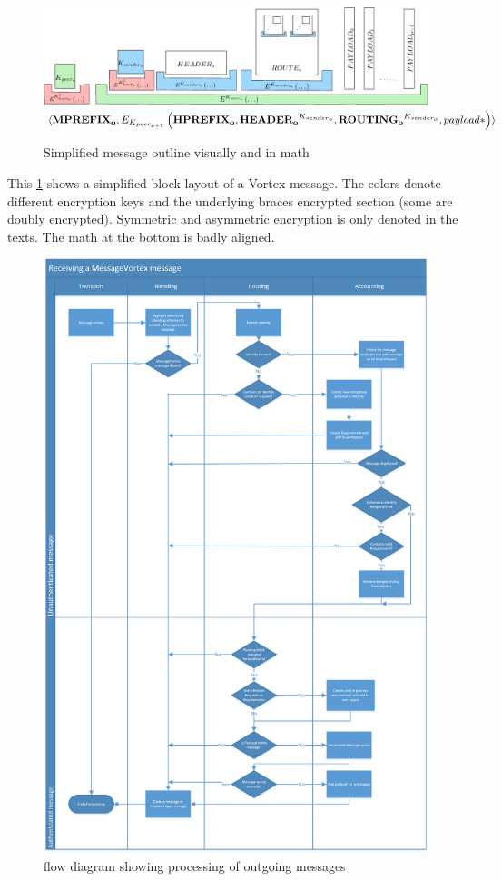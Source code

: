 \documentclass[11pt]{extarticle}
\newcommand{\splitatcommas}[1]{%
	\begingroup
	\ifnum\mathcode`,="8000
	\else
	\begingroup\lccode`~=`, \lowercase{\endgroup
		\edef~{\mathchar\the\mathcode`, \penalty0 \noexpand\hspace{0pt plus 1em}}%
	}\mathcode`,="8000
	\fi
	#1%
	\endgroup
}
\begin{document}
	\begin{figure}[!h]
	 	\includegraphics[width=\textwidth]{inc/blockLayoutSimplified}
	 	$\splitatcommas{\langle \mathbf{MPREFIX_o}, E_{K_{peer_{o+1}}}\left( \mathbf{HPREFIX_o}, \mathbf{HEADER_o}^{K_{sender_o}}, \mathbf{ROUTING_o}^{K_{sender_o}}, payload* \right) \rangle}$
	 	\caption{Simplified message outline visually and in math}
	 	\label{fig:messageOutline}
	\end{figure}
	This \cref{fig:messageOutline} shows a simplified block layout of a Vortex message. The colors denote different encryption keys and the underlying braces encrypted section (some are doubly encrypted). Symmetric and asymmetric encryption is only denoted in the texts. The math at the bottom is badly aligned.
	 
	\begin{figure}[H]
	 	\centering
	 	\includegraphics[height=0.45\textheight]{inc/flowchart_message_receiving}
	 	\caption{flow diagram showing processing of outgoing messages}
	 	\label{fig:msgReceiveProcessing}
	\end{figure}
 
\end{document}
